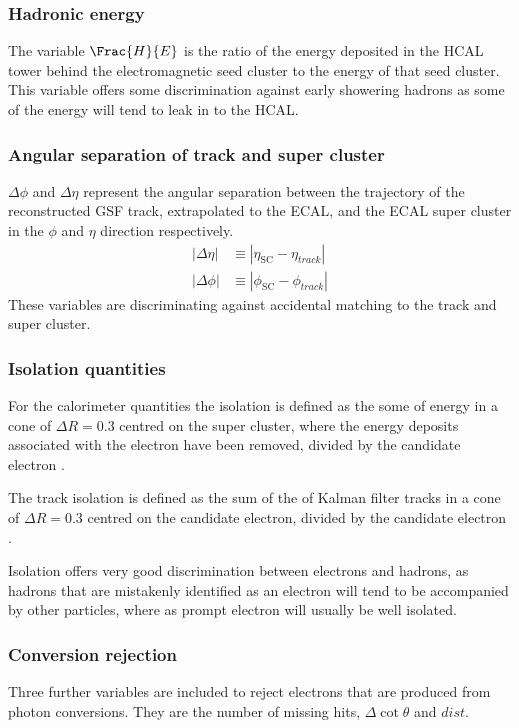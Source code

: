 \subsubsection{Hadronic energy}
The variable $\Frac{H}{E}$ is the ratio of the energy deposited in the HCAL
tower behind the electromagnetic seed cluster to the energy of that seed
cluster. This variable offers some discrimination against early showering
hadrons as some of the energy will tend to leak in to the HCAL.

\subsubsection{Angular separation of track and super cluster}
$\Delta\phi$ and $\Delta\eta$ represent the angular separation between the
trajectory of the reconstructed GSF track, extrapolated to the ECAL, and the ECAL super cluster in the $\phi$
and $\eta$ direction respectively.
\begin{align}
|\Delta\eta| &\equiv |\eta_{\text{SC}} - \eta_{track}|\\
|\Delta\phi| &\equiv |\phi_{\text{SC}} - \phi_{track}|
\end{align}
These variables are discriminating against accidental matching to the track and
super cluster.

\subsubsection{Isolation quantities}
For the calorimeter quantities the isolation is defined as the some of energy in
a cone of $\Delta R = 0.3 $ centred on the super cluster, where the energy
deposits associated with the electron have been removed, divided by the
candidate electron \Pt.

The track isolation is defined as the sum of the \Pt of Kalman filter tracks in
a cone of $\Delta R = 0.3 $ centred on the candidate electron, divided by the
candidate electron \Pt.

Isolation offers very good discrimination between electrons and hadrons, as
hadrons that are mistakenly identified as an electron will tend to be
accompanied by other particles, where as prompt electron will usually be well
isolated.

\subsubsection{Conversion rejection}
Three further variables are included to reject electrons that are produced from
photon conversions. They are the number of missing hits, $\Delta\cot\theta$ and
$dist$. 

